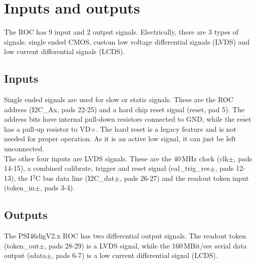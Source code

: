 \section{Inputs and outputs}
 The ROC has 9 input and 2 output signals. Electrically, there are 3 types of signals: single ended CMOS, custom low voltage differential signals (LVDS) and low current differential signals (LCDS). 
 \subsection{Inputs}
 Single ended signals  are used for slow or static signals. These are the ROC address (I2C\_Ax, pads 22-25) and a hard chip reset signal ($\overline{\mathrm{reset}}$, pad 5). The address bits have internal pull-down resistors connected to GND, while the $\overline{\mathrm{reset}}$ has a pull-up resistor to VD+. The hard reset is a legacy feature and is not needed for proper operation. As it is an active low signal, it can just be left unconnected.\\
The other four inputs are LVDS signals. These are the 40\,MHz clock (clk$\pm$, pads 14-15), a combined calibrate, trigger and reset signal (cal\_trig\_res$\pm$, pads 12-13), the I$^2$C bus data line (I2C\_dat$\pm$, pads 26-27) and the readout token input (token\_in$\pm$, pads 3-4).\\
\subsection{Outputs}
The PSI46digV2.x ROC has two differential output signals. The readout token (token\_out$\pm$, pads 28-29) is a LVDS signal, while the 160\,MBit/sec serial data output (sdata$\pm$, pads 6-7) is a low current differential signal (LCDS).\\
